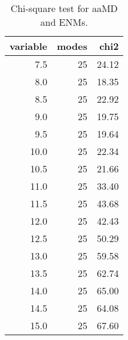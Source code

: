 \begin{table}[center]
\centering
\caption{Chi-square test for aaMD and ENMs.}
\label{tab:chi2}
\begin{tabular}{rrr}
\toprule
 variable &  modes &  chi2 \\
\midrule
      7.5 &     25 & 24.12 \\
      8.0 &     25 & 18.35 \\
      8.5 &     25 & 22.92 \\
      9.0 &     25 & 19.75 \\
      9.5 &     25 & 19.64 \\
     10.0 &     25 & 22.34 \\
     10.5 &     25 & 21.66 \\
     11.0 &     25 & 33.40 \\
     11.5 &     25 & 43.68 \\
     12.0 &     25 & 42.43 \\
     12.5 &     25 & 50.29 \\
     13.0 &     25 & 59.58 \\
     13.5 &     25 & 62.74 \\
     14.0 &     25 & 65.00 \\
     14.5 &     25 & 64.08 \\
     15.0 &     25 & 67.60 \\
\bottomrule
\end{tabular}
\end{table}
